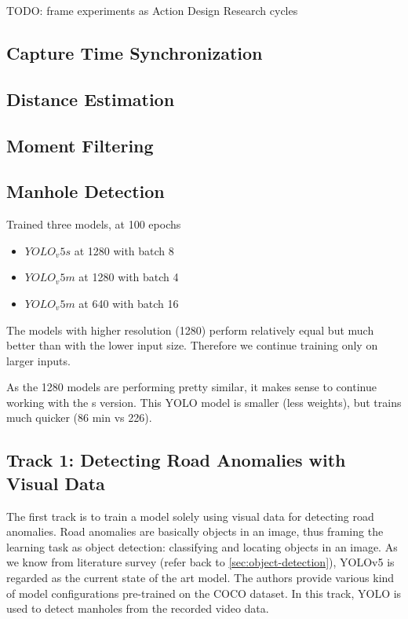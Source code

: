 TODO: frame experiments as Action Design Research cycles


\subsection{Capture Time Synchronization}
\label{sec:capture-time-synchronization}


\subsection{Distance Estimation}
\label{sec:object-distance}


\subsection{Moment Filtering}


\subsection{Manhole Detection}
Trained three models, at 100 epochs
\begin{itemize}
\item $YOLO_v5s$ at 1280 with batch 8
\item $YOLO_v5m$ at 1280 with batch 4
\item $YOLO_v5m$ at 640 with batch 16
\end{itemize}

The models with higher resolution (1280) perform relatively equal but much better than with the lower input size. Therefore we continue training only on larger inputs. 

As the 1280 models are performing pretty similar, it makes sense to continue working with the s version. This YOLO model is smaller (less weights), but trains much quicker (86 min vs 226). 

\subsection{Track 1: Detecting Road Anomalies with Visual Data}

The first track is to train a model solely using visual data for detecting road anomalies. Road anomalies are basically objects in an image, thus framing the learning task as object detection: classifying and locating objects in an image. As we know from literature survey (refer back to \ref{sec:object-detection}), YOLOv5 \cite{Jocher2021} is regarded as the current state of the art model. The authors provide various kind of model configurations pre-trained on the COCO dataset. In this track, YOLO is used to detect manholes from the recorded video data.


